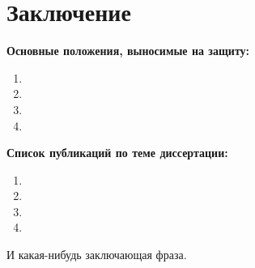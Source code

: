\chapter*{Заключение}						%

\textbf{Основные положения, выносимые на защиту:}
\begin{enumerate}
  \item 
  \item 
  \item 
  \item
\end{enumerate}

\textbf{Список публикаций по теме диссертации:}
\begin{enumerate}
  \item 
  \item 
  \item 
  \item
\end{enumerate}

И какая-нибудь заключающая фраза.

\clearpage